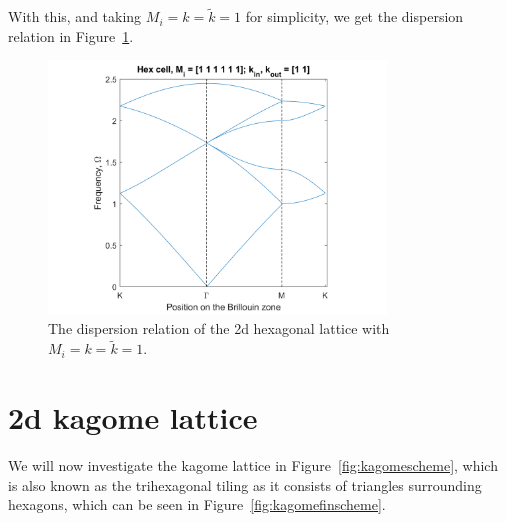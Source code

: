 With this, and taking $M_i=k=\tilde{k}=1$ for simplicity, we get the dispersion
relation in Figure~\ref{fig:hexdisper}.

\begin{figure}[!h]
\centering
\includegraphics[width=0.8\textwidth]{imgs/hexdisper.png}
\caption{\label{fig:hexdisper} The dispersion relation of the 2d hexagonal
    lattice with $M_i=k=\tilde{k}=1$.}
\end{figure}


\section{2d kagome lattice}
We will now investigate the kagome lattice in Figure~\ref{fig:kagomescheme},
which is also known as the trihexagonal tiling as it consists of triangles
surrounding hexagons, which can be seen in Figure~\ref{fig:kagomefinscheme}.

